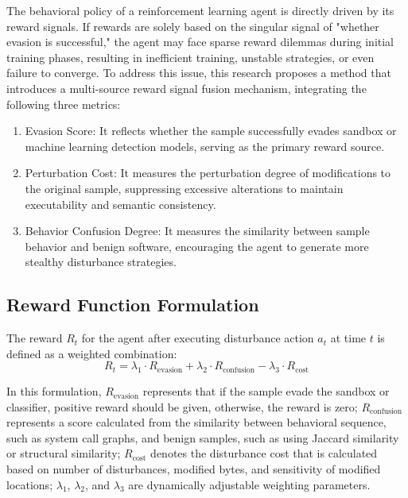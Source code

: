 The behavioral policy of a reinforcement learning agent is directly driven by its reward signals. If rewards are solely based on the singular signal of "whether evasion is successful," the agent may face sparse reward dilemmas during initial training phases, resulting in inefficient training, unstable strategies, or even failure to converge. To address this issue, this research proposes a method that introduces a multi-source reward signal fusion mechanism, integrating the following three metrics:
\begin{enumerate}
\item Evasion Score: It reflects whether the sample successfully evades sandbox or machine learning detection models, serving as the primary reward source.

\item Perturbation Cost: It measures the perturbation degree of modifications to the original sample, suppressing excessive alterations to maintain executability and semantic consistency.

\item Behavior Confusion Degree: It measures the similarity between sample behavior and benign software, encouraging the agent to generate more stealthy disturbance strategies.
\end{enumerate}

\subsection{Reward Function Formulation}
 
The reward $R_t$ for the agent after executing disturbance action $a_t$ at time $t$ is defined as a weighted combination:
\begin{equation}
	R_t = \lambda_1 \cdot R_{\text{evasion}} + \lambda_2 \cdot R_{\text{confusion}} - \lambda_3 \cdot R_{\text{cost}}
\end{equation}

In this formulation, $R_{\text{evasion}}$ represents that if the sample evade the sandbox or classifier, positive reward should be given, otherwise, the reward is zero; $R_{\text{confusion}}$ represents a score calculated from the similarity between behavioral sequence, such as system call graphs, and benign samples, such as using Jaccard similarity or structural similarity; $R_{\text{cost}}$ denotes the disturbance cost that is calculated based on number of disturbances, modified bytes, and sensitivity of modified locations; $\lambda_1$, $\lambda_2$, and $\lambda_3$ are dynamically adjustable weighting parameters.

